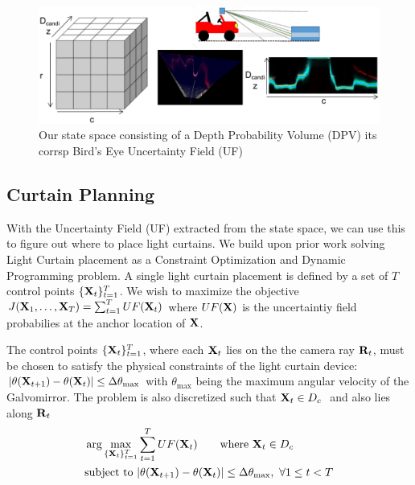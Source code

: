 \begin{figure}[h]
   \centering
   \begin{minipage}{0.5\textwidth}
       \centering
       \includegraphics[width=1.0\textwidth]{figures/bev.pdf}
   \end{minipage}\hfill
   \centering
   \caption{Our state space consisting of a Depth Probability Volume (DPV) its corrsp Bird's Eye Uncertainty Field (UF)}
\end{figure}

\subsection{Curtain Planning}

With the Uncertainty Field (UF) extracted from the state space, we can use this to figure out where to place light curtains. We build upon prior work solving Light Curtain placement as a Constraint Optimization and Dynamic Programming problem. A single light curtain placement is defined by a set of $T$ control points $\{\mathbf{X}_t\}_{t=1}^T$. We wish to maximize the objective $J(\mathbf{X}_1, \dots, \mathbf{X}_T) = \sum_{t=1}^T UF(\mathbf{X}_t)$ where $UF(\mathbf{X})$ is the uncertaintiy field probabilies at the anchor location of $\mathbf{X}$.

The control points $\{\mathbf{X}_t\}_{t=1}^T$, where each $\mathbf{X}_t$ lies on the the camera ray $\mathbf{R}_t$, must be chosen to satisfy the physical constraints of the light curtain device: $|\theta(\mathbf{X}_{t+1}) - \theta(\mathbf{X}_t)| \leq \Delta \theta_\text{max}$ with $\theta_\text{max}$ being the maximum angular velocity of the Galvomirror. The problem is also discretized such that $\X_{t} \in D_c\ $ and also lies along $\mathbf{R}_t$
\begin{align}
    &\arg \max_{\{\mathbf{X}_t\}_{t=1}^T} \sum_{t=1}^T UF(\mathbf{X}_t) \qquad \text{where}\ \mathbf{X}_t \in D_c\ \nonumber\\
    &\text{subject to}\ |\theta(\mathbf{X}_{t+1}) - \theta(\mathbf{X}_t)| \leq \Delta \theta_\text{max},\ \forall 1 \leq t < T
    \label{eq:constraint}
\end{align}

